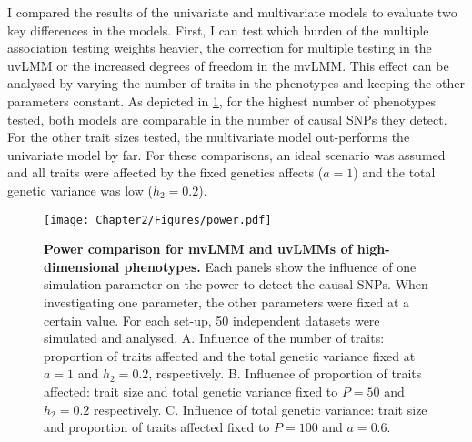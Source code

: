 I compared the results of the univariate and multivariate models to evaluate  two key differences in the models. First, I can test which burden of the multiple association testing weights heavier, the correction for multiple testing in the uvLMM or the increased degrees of freedom in the mvLMM. This effect can be analysed by varying the number of traits in the phenotypes and keeping the other parameters constant. As depicted in \cref{fig:power}, for the highest number of phenotypes tested, both models are comparable in the number of causal SNPs they detect. For the other trait sizes tested, the multivariate model out-performs the univariate model by far. For these comparisons, an ideal scenario was assumed and all traits were affected by the fixed genetics affects (\(a=1\)) and the total genetic variance was low (\(h_2=0.2\)). 
%
\begin{figure}[hbtp]
	\centering
	\texttt{[image: Chapter2/Figures/power.pdf]}
	\caption[\textbf{Power comparison for mvLMM and uvLMMs of high-dimensional phenotypes.}]{\textbf{Power comparison for mvLMM and uvLMMs of high-dimensional phenotypes.} Each panels show the influence of one simulation parameter on the power to detect the causal SNPs. When investigating one parameter, the other parameters were fixed at a certain value. For each set-up, 50 independent datasets were simulated and analysed. A. Influence of the number of traits: proportion of traits affected and the total genetic variance fixed at \(a=1\) and \(h_2=0.2\), respectively. B. Influence of proportion of traits affected: trait size and total genetic variance fixed to \(P=50\) and \(h_2=0.2\) respectively. C. Influence of total genetic variance:  trait size and  proportion of traits affected fixed to \(P=100\) and \(a=0.6\).} 
 	\label{fig:power}
\end{figure}

